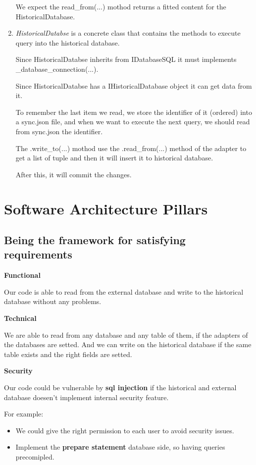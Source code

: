 \begin{enumerate}
     We expect the read\_from(...) mothod returns a fitted content for the HistoricalDatabase. 

	\item \textit{HistoricalDatabse} is a concrete class that contains the methods to execute query into the historical database.
	
     Since HistoricalDatabse inherits from IDatabaseSQL it must implements \_database\_connection(...).
    
     Since HistoricalDatabse has a IHistoricalDatabase object it can get data from it.
     
     To remember the last item we read, we store the identifier of it (ordered) into a sync.json file, and when we want to execute the next query, we should read from sync.json the identifier.
        
     The .write\_to(...) mothod use the .read\_from(...) method of the adapter to get a list of tuple and then it will insert it to historical database. 
     
     After this, it will commit the changes.
\end{enumerate}

\section{Software Architecture Pillars}

\subsection{Being the framework for satisfying requirements}

\textbf{Functional}

Our code is able to read from the external database and write to the historical database without any problems.

\textbf{Technical}

We are able to read from any database and any table of them, if the adapters of the databases are setted. And we can write on the historical database if the same table exists and the right fields are setted.

\textbf{Security}

Our code could be vulnerable by \textbf{sql injection} if the historical and external database doesen't implement internal security feature.

For example:
\begin{itemize}
	\item We could give the right permission to each user to avoid security issues.
	\item Implement the \textbf{prepare statement} database side, so having queries precomipled.
\end{itemize}

